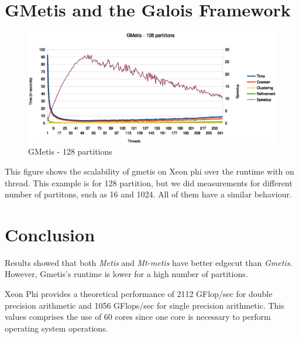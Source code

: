\documentclass[abstract=on,9pt,twocolumn]{scrartcl}
\begin{document}

\section{GMetis and the Galois Framework} %

\begin{center}
\begin{figure}[htbp]
    \includegraphics[scale=.40]{img/gmetis128.eps}
    \caption{GMetis - 128 partitions}
\end{figure}
\end{center}

This figure shows the scalability of gmetis on Xeon phi over the runtime
with on thread. This example is for 128 partition, but we did
measurements for different number of partitons, such as 16 and 1024. All
of them have a similar behaviour.


\section{Conclusion}

Results showed that both \textit{Metis} and \textit{Mt-metis} have
better edgecut than \textit{Gmetis}. However, Gmetis's runtime is lower
for a high number of partitions.


Xeon Phi provides a theoretical performance of 2112 GFlop/sec for double
precision arithmetic and 1056 GFlops/sec for single precision
arithmetic. This values comprises the use of 60 cores since one core is
necessary to perform operating system operations.




%
%
\end{document}
